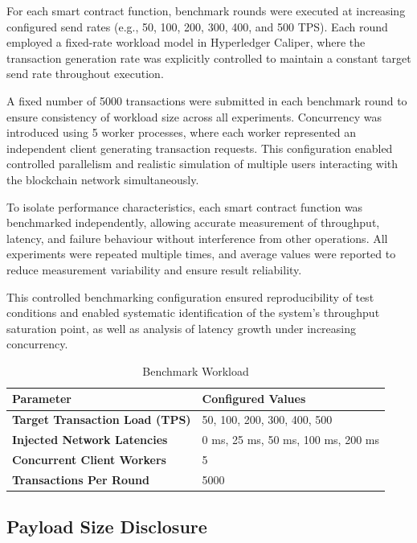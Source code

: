 \documentclass[12pt]{article}
\begin{document}
	For each smart contract function, benchmark rounds were executed at increasing configured send rates (e.g., 50, 100, 200, 300, 400, and 500 TPS). Each round employed a fixed-rate workload model in Hyperledger Caliper, where the transaction generation rate was explicitly controlled to maintain a constant target send rate throughout execution.
	
	A fixed number of 5000 transactions were submitted in each benchmark round to ensure consistency of workload size across all experiments. Concurrency was introduced using 5 worker processes, where each worker represented an independent client generating transaction requests. This configuration enabled controlled parallelism and realistic simulation of multiple users interacting with the blockchain network simultaneously.
	
	To isolate performance characteristics, each smart contract function was benchmarked independently, allowing accurate measurement of throughput, latency, and failure behaviour without interference from other operations. All experiments were repeated multiple times, and average values were reported to reduce measurement variability and ensure result reliability.
	
	This controlled benchmarking configuration ensured reproducibility of test conditions and enabled systematic identification of the system's throughput saturation point, as well as analysis of latency growth under increasing concurrency.

	\begin{table}[ht]
		\centering
		\caption{Benchmark Workload}
		\label{tab:benchmarking_params}
		\renewcommand{\arraystretch}{1.3}
		\begin{tabular}{|p{5cm}|p{8cm}|}
			\hline
			\textbf{Parameter} & \textbf{Configured Values} \\
			\hline
			\textbf{Target Transaction Load (TPS)} & 50, 100, 200, 300, 400, 500 \\
			\hline
			\textbf{Injected Network Latencies} & 0 ms, 25 ms, 50 ms, 100 ms, 200 ms \\
			\hline
			\textbf{Concurrent Client Workers} & 5 \\
			\hline
			\textbf{Transactions Per Round} & 5000 \\
			\hline
		\end{tabular}
	\end{table}

	\subsection{Payload Size Disclosure}
	
\end{document}
